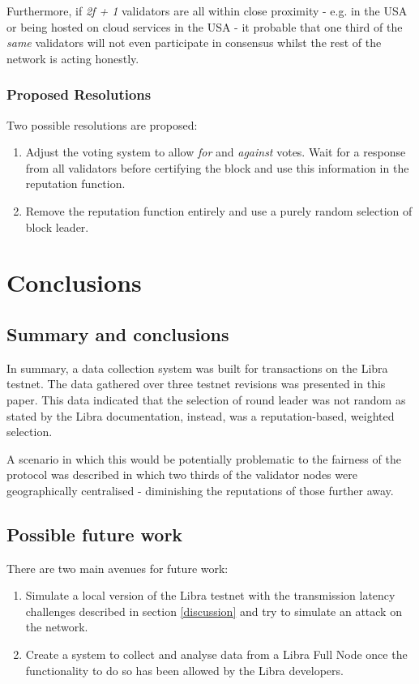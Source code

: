 \documentclass[12pt,openany,a4paper]{book}
\begin{document}
Furthermore, if \textit{2f + 1} validators are all within close proximity - e.g. in 
the USA or being hosted on cloud services in the USA - it probable that one third 
of the \textit{same} validators will not even participate in consensus whilst the rest of the 
network is acting honestly.

\subsection{Proposed Resolutions}
Two possible resolutions are proposed:
\begin{enumerate}
    \item Adjust the voting system to allow \textit{for} and \textit{against} votes. Wait 
    for a response from all validators before certifying the block and use this information in 
    the reputation function.
    \item Remove the reputation function entirely and use a purely random selection of block leader.
\end{enumerate}

\chapter{Conclusions}
\label{conc}
\section{Summary and conclusions}
\label{conc:summ}
In summary, a data collection system was built for transactions on the Libra testnet.
The data gathered over three testnet revisions was presented in this paper.
This data indicated that the selection of round leader was not random as stated 
by the Libra documentation, instead, was a reputation-based, weighted selection.

A scenario in which this would be potentially problematic to the fairness of the protocol was
described in which two thirds of the validator nodes were geographically centralised - 
diminishing the reputations of those further away.

\section{Possible future work}
\label{conc:future}
There are two main avenues for future work:
\begin{enumerate}
    \item Simulate a local version of the Libra testnet with the transmission latency 
    challenges described in section \ref{discussion} and try to simulate an attack on 
    the network.
    \item Create a system to collect and analyse data from a Libra Full Node once 
    the functionality to do so has been allowed by the Libra developers.
\end{enumerate}
\end{document}
